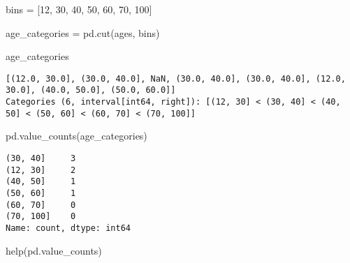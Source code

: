 \documentclass[
  letterpaper,
  DIV=11,
  numbers=noendperiod]{scrreprt}
\newenvironment{Shaded}{\begin{snugshade}}{\end{snugshade}}
\newcommand{\BuiltInTok}[1]{\textcolor[rgb]{0.00,0.23,0.31}{#1}}
\newcommand{\DecValTok}[1]{\textcolor[rgb]{0.68,0.00,0.00}{#1}}
\newcommand{\NormalTok}[1]{\textcolor[rgb]{0.00,0.23,0.31}{#1}}
\newcommand{\OperatorTok}[1]{\textcolor[rgb]{0.37,0.37,0.37}{#1}}
\begin{document}
\begin{Shaded}
\begin{Highlighting}[]
\NormalTok{bins }\OperatorTok{=}\NormalTok{ [}\DecValTok{12}\NormalTok{, }\DecValTok{30}\NormalTok{, }\DecValTok{40}\NormalTok{, }\DecValTok{50}\NormalTok{, }\DecValTok{60}\NormalTok{, }\DecValTok{70}\NormalTok{, }\DecValTok{100}\NormalTok{]}
\end{Highlighting}
\end{Shaded}

\begin{Shaded}
\begin{Highlighting}[]
\NormalTok{age\_categories }\OperatorTok{=}\NormalTok{ pd.cut(ages, bins)}
\end{Highlighting}
\end{Shaded}

\begin{Shaded}
\begin{Highlighting}[]
\NormalTok{age\_categories}
\end{Highlighting}
\end{Shaded}

\begin{verbatim}
[(12.0, 30.0], (30.0, 40.0], NaN, (30.0, 40.0], (30.0, 40.0], (12.0, 30.0], (40.0, 50.0], (50.0, 60.0]]
Categories (6, interval[int64, right]): [(12, 30] < (30, 40] < (40, 50] < (50, 60] < (60, 70] < (70, 100]]
\end{verbatim}

\begin{Shaded}
\begin{Highlighting}[]
\NormalTok{pd.value\_counts(age\_categories)}
\end{Highlighting}
\end{Shaded}

\begin{verbatim}
(30, 40]     3
(12, 30]     2
(40, 50]     1
(50, 60]     1
(60, 70]     0
(70, 100]    0
Name: count, dtype: int64
\end{verbatim}

\begin{Shaded}
\begin{Highlighting}[]
\BuiltInTok{help}\NormalTok{(pd.value\_counts)}
\end{Highlighting}
\end{Shaded}
\end{document}
